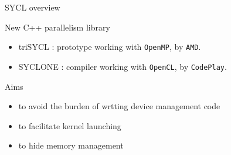 \documentclass[10pt, compress]{beamer}
\begin{document}



\begin{frame}{SYCL overview}

\begin{block}{New C++ parallelism library}
\begin{itemize}
\item \alert{triSYCL} : prototype working with \texttt{OpenMP}, by \texttt{AMD}.
\item \alert{SYCLONE} : compiler working with \texttt{OpenCL}, by \texttt{CodePlay}. 
\end{itemize}
\end{block}

\begin{block}{Aims}
\begin{itemize}
\item to avoid the burden of wrtting device management code
\item to facilitate kernel launching
\item to hide memory management
\end{itemize}
\end{block}

\end{frame}
\end{document}
